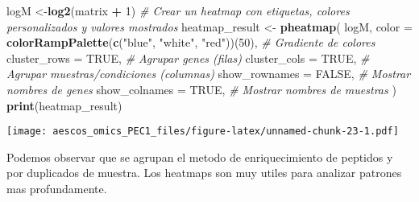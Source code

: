 \documentclass[
]{article}
\newenvironment{Shaded}{\begin{snugshade}}{\end{snugshade}}
\newcommand{\AttributeTok}[1]{\textcolor[rgb]{0.13,0.29,0.53}{#1}}
\newcommand{\CommentTok}[1]{\textcolor[rgb]{0.56,0.35,0.01}{\textit{#1}}}
\newcommand{\ConstantTok}[1]{\textcolor[rgb]{0.56,0.35,0.01}{#1}}
\newcommand{\DecValTok}[1]{\textcolor[rgb]{0.00,0.00,0.81}{#1}}
\newcommand{\FunctionTok}[1]{\textcolor[rgb]{0.13,0.29,0.53}{\textbf{#1}}}
\newcommand{\NormalTok}[1]{#1}
\newcommand{\OtherTok}[1]{\textcolor[rgb]{0.56,0.35,0.01}{#1}}
\newcommand{\SpecialCharTok}[1]{\textcolor[rgb]{0.81,0.36,0.00}{\textbf{#1}}}
\newcommand{\StringTok}[1]{\textcolor[rgb]{0.31,0.60,0.02}{#1}}
\begin{document}
\begin{Shaded}
\begin{Highlighting}[]
\NormalTok{logM }\OtherTok{\textless{}{-}}\FunctionTok{log2}\NormalTok{(matrix }\SpecialCharTok{+} \DecValTok{1}\NormalTok{)}
\CommentTok{\# Crear un heatmap con etiquetas, colores personalizados y valores mostrados}
\NormalTok{heatmap\_result }\OtherTok{\textless{}{-}} \FunctionTok{pheatmap}\NormalTok{(}
\NormalTok{  logM, }
  \AttributeTok{color =} \FunctionTok{colorRampPalette}\NormalTok{(}\FunctionTok{c}\NormalTok{(}\StringTok{"blue"}\NormalTok{, }\StringTok{"white"}\NormalTok{, }\StringTok{"red"}\NormalTok{))(}\DecValTok{50}\NormalTok{),  }\CommentTok{\# Gradiente de colores}
  \AttributeTok{cluster\_rows =} \ConstantTok{TRUE}\NormalTok{,      }\CommentTok{\# Agrupar genes (filas)}
  \AttributeTok{cluster\_cols =} \ConstantTok{TRUE}\NormalTok{,      }\CommentTok{\# Agrupar muestras/condiciones (columnas)}
  \AttributeTok{show\_rownames =} \ConstantTok{FALSE}\NormalTok{,     }\CommentTok{\# Mostrar nombres de genes}
  \AttributeTok{show\_colnames =} \ConstantTok{TRUE}\NormalTok{,      }\CommentTok{\# Mostrar nombres de muestras}
\NormalTok{)}
\FunctionTok{print}\NormalTok{(heatmap\_result)}
\end{Highlighting}
\end{Shaded}

\texttt{[image: aescos\_omics\_PEC1\_files/figure-latex/unnamed-chunk-23-1.pdf]}

Podemos observar que se agrupan el metodo de enriquecimiento de peptidos
y por duplicados de muestra. Los heatmaps son muy utiles para analizar
patrones mas profundamente.
\end{document}
